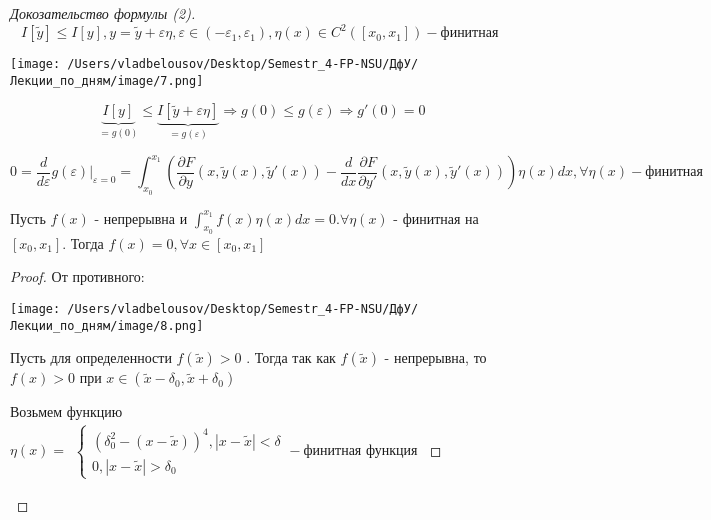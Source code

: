\documentclass[12pt, a4paper]{report}
\begin{document}
\begin{proof}[Докозательство формулы (2)]
    \[ I[\tilde{y}] \le I[y] , y = \tilde{y} + \varepsilon \eta , \varepsilon \in  (- \varepsilon_1, \varepsilon_1), \eta(x) \in C^2([x_0,x_1])  - \text{финитная }    \] 
    
    \begin{center}
        \texttt{[image: /Users/vladbelousov/Desktop/Semestr\_4-FP-NSU/ДфУ/Лекции\_по\_дням/image/7.png]}
    \end{center}

    \[ \underbrace{I[y]}_{= g(0)} \le \underbrace{I[\tilde{y}+ \varepsilon \eta ]}_{=g(\varepsilon)} \Rightarrow g(0) \le g(\varepsilon) \Rightarrow g'( 0) = 0\] 

    \[ 0= \frac{d}{d \varepsilon} g(\varepsilon) |_{\varepsilon= 0 }= \int_{x_0}^{x_1} \left( \frac{\partial F }{\partial y } ( x , \tilde{y}(x) , \tilde{y }' (x) ) - \frac{d}{dx }  \frac{\partial F }{\partial y' } ( x , \tilde{y}(x) , \tilde{y }' (x) )  \right) \eta (x) dx , \forall \eta (x)  - \text{финитная}    \] 

    \begin{lemma}[Лагранжа]     
        Пусть \( f(x) \) - непрерывна и \( \displaystyle \int_{x_0}^{x_1} f(x) \eta (x) dx =0. \forall \eta (x) \) - финитная на \( [x_0,x_1] \). Тогда \( f(x) = 0 , \forall x \in  [x_0,x_1] \) 
    \end{lemma}

    \begin{proof}
        От противного:
        \begin{center}
            \texttt{[image: /Users/vladbelousov/Desktop/Semestr\_4-FP-NSU/ДфУ/Лекции\_по\_дням/image/8.png]}
        \end{center}
        Пусть для определенности \( f(\tilde{x } )> 0        \) . Тогда так как \( f(\tilde{x}) \) - непрерывна, то \( f(x)>0    \) при \( x \in (\tilde{x}- \delta_0, \tilde{x}+\delta_0) \) 

        Возьмем функцию \( \eta(x) = \begin{aligned}
            \begin{cases}
                (\delta_0 ^2 - (x- \tilde{x})) ^ 4 , |x- \tilde{x}|< \delta   \\
                0 , |x- \tilde{ x } | > \delta_0
                \end{cases}
                - \text{финитная функция} 
        \end{aligned}\)
        

\end{proof}
\end{proof}
\end{document}
